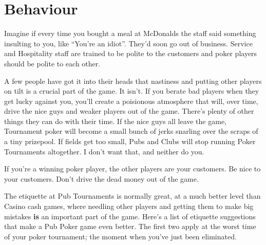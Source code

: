 \chapter{Behaviour}


Imagine if every time you bought a meal at McDonalds the staff
said something insulting to you, like ``You're an idiot''. They'd
soon go out of business. Service and Hospitality staff are trained
to be polite to the customers and poker players should be polite to
each other.

A few people have got it into their heads that nastiness
and putting other players on tilt is a crucial part of the game.
It isn't. If you berate bad players when they get lucky against
you, you'll create a poisionous atmosphere that will, over time,
drive the nice guys and weaker players out of the game. There's plenty
of other things they can do with their time. If the nice
guys all leave the game, Tournament poker will become a small
bunch of jerks snarling over the scraps of a tiny prizepool.
If fields get too small, Pubs and Clubs will stop running Poker
Tournaments altogether. I don't want that, and neither do you.

If you're a winning poker player, the other players are
your customers. Be nice to your customers. Don't drive the dead money
out of the game.

The etiquette at Pub Tournaments is normally great, at a much
better level than Casino cash games, where needling other players
and getting them to make big mistakes \textbf{is} an important
part of the game. Here's a list of etiquette suggestions that
make a Pub Poker game even better. The first two apply at the worst
time of your poker tournament; the moment when you've just been
eliminated.

